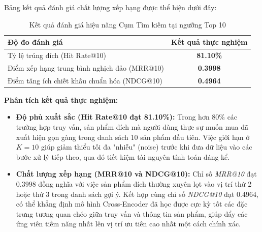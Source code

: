 Bảng kết quả đánh giá chất lượng xếp hạng được thể hiện dưới đây:

\begin{table}[H]
    \centering
    \caption{Kết quả đánh giá hiệu năng Cụm Tìm kiếm tại ngưỡng Top 10}
    \label{tab:ranking_metrics}
    \vspace{0.2cm}
    \begin{tabular}{l c}
        \toprule
        \textbf{Độ đo đánh giá} & \textbf{Kết quả thực nghiệm} \\
        \midrule
        Tỷ lệ trúng đích (Hit Rate@10) & \textbf{81.10\%} \\
        Điểm xếp hạng trung bình nghịch đảo (MRR@10) & \textbf{0.3998} \\
        Điểm tăng ích chiết khấu chuẩn hóa (NDCG@10) & \textbf{0.4964} \\
        \bottomrule
    \end{tabular}
\end{table}

\textbf{Phân tích kết quả thực nghiệm:}
\begin{itemize}
    \item \textbf{Độ phủ xuất sắc (Hit Rate@10 đạt 81.10\%):} Trong hơn 80\% các trường hợp truy vấn, sản phẩm đích mà người dùng thực sự muốn mua đã xuất hiện gọn gàng trong danh sách 10 sản phẩm đầu tiên. Việc giới hạn ở $K=10$ giúp giảm thiểu tối đa "nhiễu" (noise) trước khi đưa dữ liệu vào các bước xử lý tiếp theo, qua đó tiết kiệm tài nguyên tính toán đáng kể.
    \item \textbf{Chất lượng xếp hạng (MRR@10 và NDCG@10):} Chỉ số \textit{MRR@10} đạt $0.3998$ đồng nghĩa với việc sản phẩm đích thường xuyên lọt vào vị trí thứ 2 hoặc thứ 3 trong danh sách gợi ý. Kết hợp cùng chỉ số \textit{NDCG@10} đạt $0.4964$, có thể khẳng định mô hình Cross-Encoder đã học được cực kỳ tốt các đặc trưng tương quan chéo giữa truy vấn và thông tin sản phẩm, giúp đẩy các ứng viên tiềm năng nhất lên vị trí ưu tiên cao nhất một cách chính xác.
\end{itemize}



